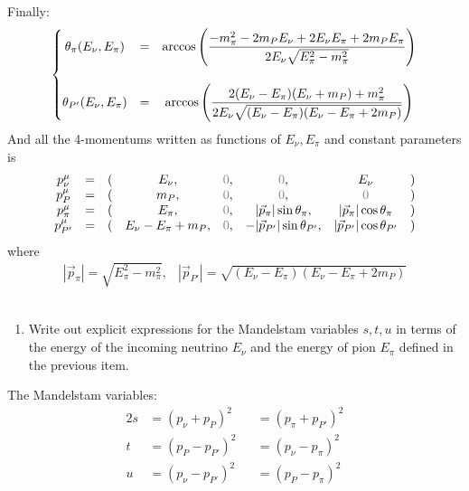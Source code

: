 \documentclass[]{article}
\numberwithin{equation}{section}
\newcommand{\0}{\textcolor{gray}{0}}
\begin{document}
Finally:
\begin{equation}
	\left\lbrace \begin{matrix}
		\theta_\pi(E_\nu, E_\pi)  &=& \arccos\left( \dfrac{- m_\pi^2 - 2m_P E_\nu + 2E_\nu E_\pi + 2m_P E_\pi}{2 E_\nu \sqrt{E_\pi^2  - m_\pi^2} }\right)\vspace{5mm}\\
		\theta_{P'}(E_\nu, E_\pi) &=& \arccos\left( \dfrac{2 (E_\nu - E_\pi) (E_\nu + m_P) + m_\pi^2}{2 E_\nu \sqrt{(E_\nu - E_\pi) (E_\nu - E_\pi + 2 m_P)}}\right) 
	\end{matrix}\right.
	\label{angulos_EnuEpi}
\end{equation}
And all the 4-momentums written as functions of \(E_\nu,E_\pi\) and constant parameters is
\begin{equation}
	\begin{matrix}
		p^\mu_\nu	&=&(&E_\nu,	&\0,&\0,								&E_\nu				&)\\
		p^\mu_P 	&=&(&m_P,	&\0,&\0,								&\0							&)\\
		p^\mu_\pi 	&=&(&E_\pi,	&\0,&|\vec{p}_\pi|\sin\theta_{\pi},	&|\vec{p}_\pi|\cos\theta_{\pi}&)\\
		p^\mu_{P'}	&=&(&E_\nu - E_\pi + m_P,&\0,&-|\vec{p}_{P'}|\sin\theta_{P'},	&|\vec{p}_{P'}|\cos\theta_{P'}&)
	\end{matrix}
	\label{momentums_EnuEpi}
\end{equation}
where
\begin{equation}
	\begin{matrix}
		|\vec{p}_\pi| = \sqrt{E_\pi^2  - m_\pi^2},& |\vec{p}_{P'}| = \sqrt{(E_\nu-E_\pi) (E_\nu - E_\pi + 2 m_P)}
	\end{matrix}
	\label{ppi_pp'_EnuEpi}
\end{equation}
\\

\begin{enumerate}
	\item[\textbf{b.}] Write out explicit expressions for the Mandelstam variables \(s, t, u\) in terms of the energy of the incoming neutrino \(E_\nu\) and the energy of pion \(E_\pi\) defined in the previous item.
\end{enumerate}

The Mandelstam variables:
\begin{alignat}{2}
	s &= (p_\nu + p_P)^2 &&= (p_\pi + p_{P'})^2\\
	t &= (p_P - p_{P'})^2 &&= (p_\nu - p_\pi)^2\\
	u &= (p_\nu - p_{P'})^2 &&= (p_P - p_\pi)^2
\end{alignat}
\end{document}
